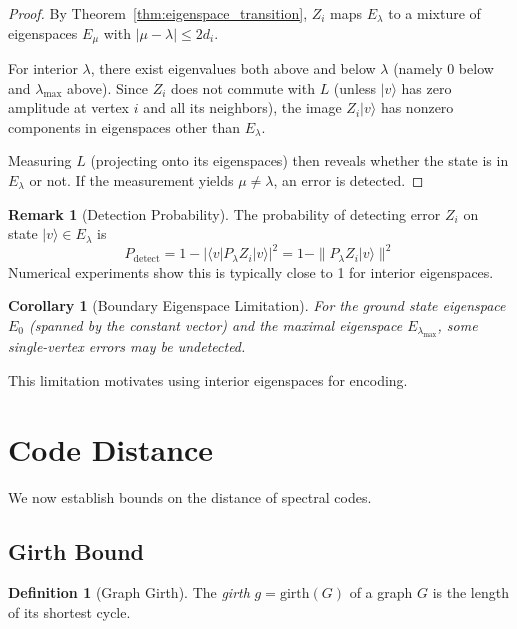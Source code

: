 \documentclass[11pt,a4paper]{article}
\newtheorem{corollary}[theorem]{Corollary}
\theoremstyle{definition}
\newtheorem{definition}[theorem]{Definition}
\newtheorem{remark}[theorem]{Remark}
\newcommand{\gmark}{\mathrm{girth}}
\newcommand{\ket}[1]{|#1\rangle}
\newcommand{\bra}[1]{\langle#1|}
\begin{document}
\begin{proof}
By Theorem~\ref{thm:eigenspace_transition}, $Z_i$ maps $E_\lambda$ to a mixture of eigenspaces $E_\mu$ with $|\mu - \lambda| \leq 2d_i$.

For interior $\lambda$, there exist eigenvalues both above and below $\lambda$ (namely $0$ below and $\lambda_{\max}$ above). Since $Z_i$ does not commute with $L$ (unless $\ket{v}$ has zero amplitude at vertex $i$ and all its neighbors), the image $Z_i\ket{v}$ has nonzero components in eigenspaces other than $E_\lambda$.

Measuring $L$ (projecting onto its eigenspaces) then reveals whether the state is in $E_\lambda$ or not. If the measurement yields $\mu \neq \lambda$, an error is detected.
\end{proof}

\begin{remark}[Detection Probability]
The probability of detecting error $Z_i$ on state $\ket{v} \in E_\lambda$ is
\begin{equation}
    P_{\text{detect}} = 1 - |\bra{v}P_\lambda Z_i\ket{v}|^2 = 1 - \|P_\lambda Z_i\ket{v}\|^2
\end{equation}
Numerical experiments show this is typically close to 1 for interior eigenspaces.
\end{remark}

\begin{corollary}[Boundary Eigenspace Limitation]
For the ground state eigenspace $E_0$ (spanned by the constant vector) and the maximal eigenspace $E_{\lambda_{\max}}$, some single-vertex errors may be undetected.
\end{corollary}

This limitation motivates using interior eigenspaces for encoding.

\section{Code Distance}
\label{sec:distance}

We now establish bounds on the distance of spectral codes.

\subsection{Girth Bound}

\begin{definition}[Graph Girth]
The \emph{girth} $g = \gmark(G)$ of a graph $G$ is the length of its shortest cycle.
\end{definition}
\end{document}
